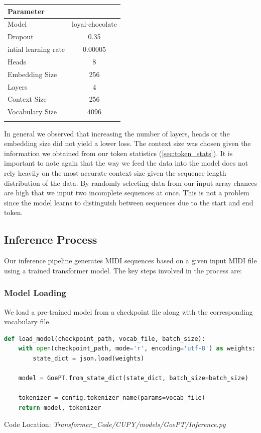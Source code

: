 \documentclass[a4paper,12pt]{extarticle}
\begin{document}
\begin{center}
    \begin{tabular}{lc}
  \toprule
  \textbf{Parameter} &  \\
  \midrule
  Model & loyal-chocolate \\
  Dropout & 0.35 \\
  intial learning rate & 0.00005 \\
  Heads  & 8 \\
  Embedding Size  & 256 \\
  Layers  & 4 \\
  Context Size & 256 \\
  Vocabulary Size & 4096 \\
  \bottomrule
  \label{tab:parameters}
\end{tabular}
\end{center}
In general we observed that increasing the number of layers, heads or the embedding size did not yield a lower loss.
The context size was chosen given the information we obtained from our token statistics (\ref{sec:token_stats}).
It is important to note again that the way we feed the data into the model does not rely heavily on the most accurate context size given the sequence length distribution of the data.
By randomly selecting data from our input array chances are high that we input two incomplete sequences at once. This is not a problem since the model learns to distinguish between sequences due to the start and end token.


\subsection{Inference Process}

Our inference pipeline generates MIDI sequences based on a given input MIDI file using a trained transformer model. The key steps involved in the process are:

\subsubsection{Model Loading}
We load a pre-trained model from a checkpoint file along with the corresponding vocabulary file.
\begin{lstlisting}[language=Python, caption=Loading the pre-trained model and tokenizer]
def load_model(checkpoint_path, vocab_file, batch_size):
    with open(checkpoint_path, mode='r', encoding='utf-8') as weights:
        state_dict = json.load(weights)

    model = GoePT.from_state_dict(state_dict, batch_size=batch_size)
    
    tokenizer = config.tokenizer_name(params=vocab_file)
    return model, tokenizer
\end{lstlisting}
Code Location: \textit{Transformer\_Code/CUPY/models/GoePT/Inference.py}
\end{document}
